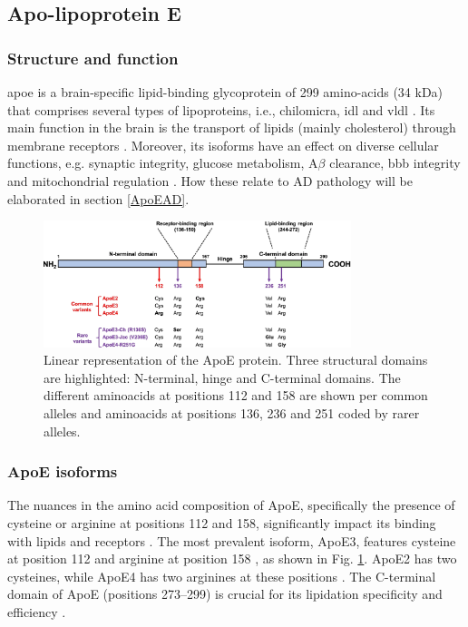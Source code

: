 \documentclass{amsart}
\begin{document}
\newpage
\subsection{Apo-lipoprotein E}\label{ApoEprot}
\subsubsection{Structure and function}
\acrshort{apoe} is a brain-specific lipid-binding glycoprotein of 299 amino-acids (34 kDa) that comprises several types of lipoproteins, i.e., chilomicra, \acrshort{idl} and \acrshort{vldl} \cite{Husain2021APOETherapeutics}. Its main function in the brain is the transport of lipids (mainly cholesterol) through membrane receptors \cite{Yang2023ApolipoproteinDisease}. Moreover, its isoforms have an effect on diverse cellular functions, e.g. synaptic integrity, glucose metabolism, A$\beta$ clearance, \acrfull{bbb} integrity and mitochondrial regulation \cite{Husain2021APOETherapeutics}. How these relate to AD pathology will be elaborated in section \ref{ApoEAD}.



\begin{figure}[htb]
  \includegraphics[width=0.8\textwidth]{figures/ApoEprot.png}
    \caption{Linear representation of the ApoE protein. Three structural domains are highlighted: N-terminal, hinge and C-terminal domains. The different aminoacids at positions 112 and 158 are shown per common alleles and aminoacids at positions 136, 236 and 251 coded by rarer alleles. \cite{Bu2022APOEVariants}}
  \label{fig2}
\end{figure}

\subsubsection{ApoE isoforms}
The nuances in the amino acid composition of ApoE, specifically the presence of cysteine or arginine at positions 112 and 158, significantly impact its binding with lipids and receptors \cite{Yassine2020APOEDisease}. The most prevalent isoform, ApoE3, features cysteine at position 112 and arginine at position 158  \cite{Yassine2020APOEDisease}, as shown in Fig. \ref{fig2}. ApoE2 has two cysteines, while ApoE4 has two arginines at these positions \cite{Yassine2020APOEDisease}. The C-terminal domain of ApoE (positions 273–299) is crucial for its lipidation specificity and efficiency \cite{Hu2015OpposingMice}.
\end{document}
